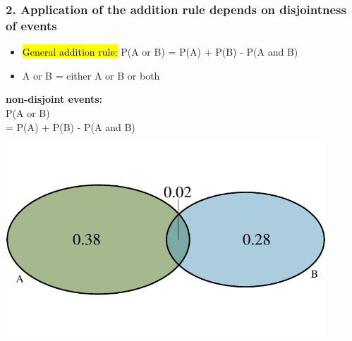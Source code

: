 \documentclass[slidestop,compress,mathserif,11pt,t,professionalfonts,xcolor=table]{beamer}
\begin{document}
\begin{frame}
\frametitle{2. Application of the addition rule depends on disjointness of events}

\begin{itemize}

\item \hl{General addition rule:} P(A or B) = P(A) + P(B) - P(A and B)

\item A or B = either A or B or both

\end{itemize}

\vspace{0.5cm}

\pause

{

\textbf{non-disjoint events:} \\
P(A or B) \\
= P(A) + P(B) - P(A and B) \\ 

\begin{center}
\includegraphics[width = 0.9\textwidth]{figures/venn/venn_non_disjoint.pdf}
\end{center}
}

\end{frame}
\end{document}
